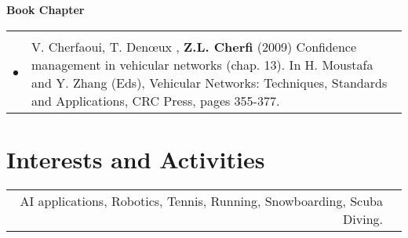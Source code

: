 \documentclass[a4paper,10pt]{article}
\begin{document}
\textbf{Book Chapter} \\
\begin{tabular}{rp{14.2cm}}
& \\
$\bullet$ & V. Cherfaoui, T. Den\oe ux ,  \textbf{Z.L. Cherfi} (2009) Confidence management in vehicular networks (chap. 13). In H. Moustafa and Y. Zhang (Eds), Vehicular Networks: Techniques, Standards and Applications, CRC Press, pages 355-377.
\end{tabular}



\section{\textcolor{RedOrange}{Interests and Activities}}
\begin{tabular}{rl}
AI applications, Robotics, Tennis, Running, Snowboarding, Scuba Diving.
\end{tabular}
\vspace*{-1cm}
\end{document}
